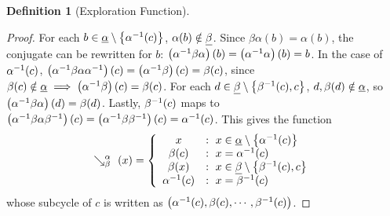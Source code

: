 \documentclass[a4paper,twoside,12pt,openany]{report}
\theoremstyle{plain}
\theoremstyle{definition}
\newtheorem{definition}{Definition}
\theoremstyle{remark}
\begin{document}
\begin{definition}[Exploration Function]
\begin{proof}
	For each \(b\in\underline{\alpha}\setminus\left\{\alpha^{-1}(c)\right\}\), \(\alpha(b)\notin\underline{\beta}\). Since \(\beta\alpha(b)=\alpha(b)\), the conjugate can be rewritten for \(b\): \(\left(\alpha^{-1}\beta\alpha\right)(b)=\left(\alpha^{-1}\alpha\right)(b)=b\). In the case of \(\alpha^{-1}(c)\), \(\left(\alpha^{-1}\beta\alpha\alpha^{-1}\right)(c)=\left(\alpha^{-1}\beta\right)(c)=\beta(c)\), since \(\beta(c)\notin\underline{\alpha}\implies\left(\alpha^{-1}\beta\right)(c)=\beta(c)\). For each \(d\in\underline{\beta}\setminus\left\{\beta^{-1}(c), c\right\}\), \(d,\beta(d)\notin\underline{\alpha}\), so \(\left(\alpha^{-1}\beta\alpha\right)(d)=\beta(d)\). Lastly, \(\beta^{-1}(c)\) maps to \(\left(\alpha^{-1}\beta\alpha\beta^{-1}\right)(c)=\left(\alpha^{-1}\beta\beta^{-1}\right)(c)=\alpha^{-1}(c)\). This gives the function 
	\begin{equation}\label{conj}
		\conjl \alpha \beta (x) = \left\{
				\begin{array}{cl}
					x & : \ x\in\alphaset\setminus\left\{\alpha\inv(c)\right\} \\
					\beta(c) & : \ x=\alpha\inv(c) \\
					\beta(x) & : \ x\in\betaset\setminus\left\{\beta\inv(c), c\right\} \\
					\alpha\inv(c) & : \ x=\beta\inv(c)
				\end{array}
			\right.
	\end{equation}
	whose subcycle of \(c\) is written as \(\left(\alpha^{-1}(c),\beta(c),\cdots,\beta^{-1}(c)\right)\).
\end{proof}


\end{definition}
\end{document}
